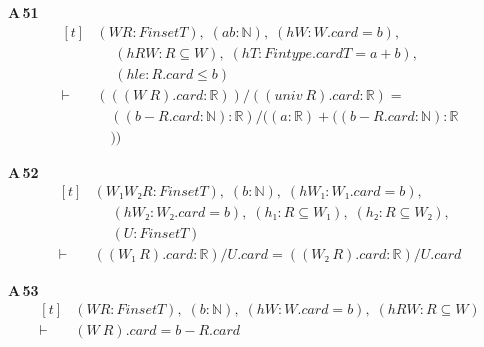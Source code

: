\noindent\textbf{A\,51}\quad{}
{\footnotesize\[ \begin{aligned}[t]
&(\mathit{W} \mathit{R} : \mathit{Finset} \mathit{T}),\; (\mathit{a} \mathit{b} : \mathbb{N} ),\; (\mathit{hW} : \mathit{W}.\mathit{card} = \mathit{b}),\\
&\quad \; (\mathit{hRW} : \mathit{R} \subseteq \mathit{W}),\; (\mathit{hT} : \mathit{Fintype}.\mathit{card} \mathit{T} = \mathit{a} + \mathit{b}),\\
&\quad \; (\mathit{hle} : \mathit{R}.\mathit{card} \leq \mathit{b})\\
\vdash\;&(((\mathit{W} \ \mathit{R}).\mathit{card} : \mathbb{R} )) / ((\mathit{univ} \ \mathit{R}).\mathit{card} : \mathbb{R} ) =\\
&\quad ((\mathit{b} - \mathit{R}.\mathit{card} : \mathbb{N} ) : \mathbb{R} ) / ((\mathit{a} : \mathbb{R} ) + ((\mathit{b} - \mathit{R}.\mathit{card} : \mathbb{N} ) : \mathbb{R}\\
&\quad ))
\end{aligned} \]}

\noindent\textbf{A\,52}\quad{}
{\footnotesize\[ \begin{aligned}[t]
&(\mathit{W₁} \mathit{W₂} \mathit{R} : \mathit{Finset} \mathit{T}),\; (\mathit{b} : \mathbb{N} ),\; (\mathit{hW₁} : \mathit{W₁}.\mathit{card} = \mathit{b}),\\
&\quad \; (\mathit{hW₂} : \mathit{W₂}.\mathit{card} = \mathit{b}),\; (\mathit{h₁} : \mathit{R} \subseteq \mathit{W₁}),\; (\mathit{h₂} : \mathit{R} \subseteq \mathit{W₂}),\\
&\quad \; (\mathit{U} : \mathit{Finset} \mathit{T})\\
\vdash\;&((\mathit{W₁} \ \mathit{R}).\mathit{card} : \mathbb{R} ) / \mathit{U}.\mathit{card} = ((\mathit{W₂} \ \mathit{R}).\mathit{card} : \mathbb{R} ) / \mathit{U}.\mathit{card}
\end{aligned} \]}

\noindent\textbf{A\,53}\quad{}
{\footnotesize\[ \begin{aligned}[t]
&(\mathit{W} \mathit{R} : \mathit{Finset} \mathit{T}),\; (\mathit{b} : \mathbb{N} ),\; (\mathit{hW} : \mathit{W}.\mathit{card} = \mathit{b}),\; (\mathit{hRW} : \mathit{R} \subseteq \mathit{W})\\
\vdash\;&(\mathit{W} \ \mathit{R}).\mathit{card} = \mathit{b} - \mathit{R}.\mathit{card}
\end{aligned} \]}

